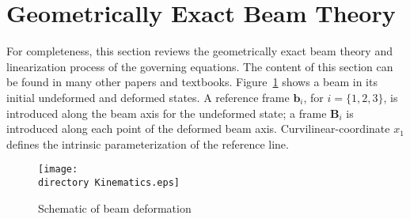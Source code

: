 \section{Geometrically Exact Beam Theory}

For completeness, this section reviews the geometrically exact beam theory and
linearization process of the governing equations. The content of this
section can be found in many other papers and textbooks.
Figure~\ref{Kinematics} shows a beam in its initial undeformed and deformed
states. A reference frame $\mathbf{b}_i$, for $i=\{ 1,2,3 \}$, is introduced along the beam axis
for the undeformed state; a frame $\mathbf{B}_i$ is introduced along each
point of the deformed beam axis. Curvilinear-coordinate $x_1$ defines the
intrinsic parameterization of the reference line.

\begin{figure}
\centering
\texttt{[image: \\directory Kinematics.eps]}
\caption{Schematic of beam deformation} \label{Kinematics}
\end{figure}

